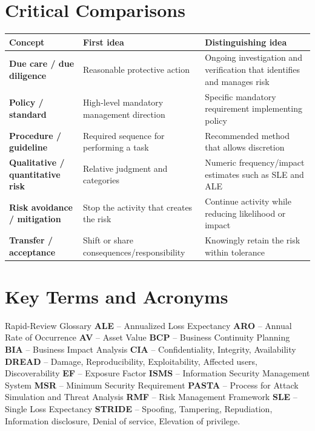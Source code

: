 \documentclass[10pt,letterpaper]{article}
\begin{document}
\section{Critical Comparisons}
\begin{center}
\small
\begin{tabularx}{\textwidth}{>{\bfseries\color{Navy}}p{}XX}
\toprule
Concept & First idea & Distinguishing idea\\
\midrule
Due care / due diligence & Reasonable protective action & Ongoing investigation and verification that identifies and manages risk\\
Policy / standard & High-level mandatory management direction & Specific mandatory requirement implementing policy\\
Procedure / guideline & Required sequence for performing a task & Recommended method that allows discretion\\
Qualitative / quantitative risk & Relative judgment and categories & Numeric frequency/impact estimates such as SLE and ALE\\
Risk avoidance / mitigation & Stop the activity that creates the risk & Continue activity while reducing likelihood or impact\\
Transfer / acceptance & Shift or share consequences/responsibility & Knowingly retain the risk within tolerance\\
\bottomrule
\end{tabularx}
\end{center}

\section{Key Terms and Acronyms}
\begin{summarybox}{Rapid-Review Glossary}
\textbf{ALE} -- Annualized Loss Expectancy \quad
\textbf{ARO} -- Annual Rate of Occurrence \quad
\textbf{AV} -- Asset Value \quad
\textbf{BCP} -- Business Continuity Planning \quad
\textbf{BIA} -- Business Impact Analysis \quad
\textbf{CIA} -- Confidentiality, Integrity, Availability \quad
\textbf{DREAD} -- Damage, Reproducibility, Exploitability, Affected users, Discoverability \quad
\textbf{EF} -- Exposure Factor \quad
\textbf{ISMS} -- Information Security Management System \quad
\textbf{MSR} -- Minimum Security Requirement \quad
\textbf{PASTA} -- Process for Attack Simulation and Threat Analysis \quad
\textbf{RMF} -- Risk Management Framework \quad
\textbf{SLE} -- Single Loss Expectancy \quad
\textbf{STRIDE} -- Spoofing, Tampering, Repudiation, Information disclosure, Denial of service, Elevation of privilege.
\end{summarybox}
\end{document}
